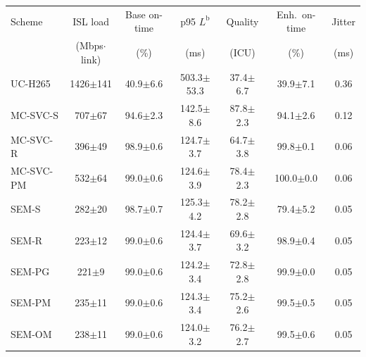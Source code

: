 \begin{tabular}{@{}lcccccc@{}}
\toprule
Scheme & ISL load & Base on-time & p95 $L^{\mathrm b}$ & Quality & Enh.\ on-time & Jitter\\
 & (Mbps$\cdot$link) & (\%) & (ms) & (ICU) & (\%) & (ms)\\
\midrule
UC-H265 & 1426$\pm$141 & 40.9$\pm$6.6 & 503.3$\pm$53.3 & 37.4$\pm$6.7 & 39.9$\pm$7.1 & 0.36\\
MC-SVC-S & 707$\pm$67 & 94.6$\pm$2.3 & 142.5$\pm$8.6 & 87.8$\pm$2.3 & 94.1$\pm$2.6 & 0.12\\
MC-SVC-R & 396$\pm$49 & 98.9$\pm$0.6 & 124.7$\pm$3.7 & 64.7$\pm$3.8 & 99.8$\pm$0.1 & 0.06\\
MC-SVC-PM & 532$\pm$64 & 99.0$\pm$0.6 & 124.6$\pm$3.9 & 78.4$\pm$2.3 & 100.0$\pm$0.0 & 0.06\\
SEM-S & 282$\pm$20 & 98.7$\pm$0.7 & 125.3$\pm$4.2 & 78.2$\pm$2.8 & 79.4$\pm$5.2 & 0.05\\
SEM-R & 223$\pm$12 & 99.0$\pm$0.6 & 124.4$\pm$3.7 & 69.6$\pm$3.2 & 98.9$\pm$0.4 & 0.05\\
SEM-PG & 221$\pm$9 & 99.0$\pm$0.6 & 124.2$\pm$3.4 & 72.8$\pm$2.8 & 99.9$\pm$0.0 & 0.05\\
SEM-PM & 235$\pm$11 & 99.0$\pm$0.6 & 124.3$\pm$3.4 & 75.2$\pm$2.6 & 99.5$\pm$0.5 & 0.05\\
SEM-OM & 238$\pm$11 & 99.0$\pm$0.6 & 124.0$\pm$3.2 & 76.2$\pm$2.7 & 99.5$\pm$0.6 & 0.05\\
\bottomrule
\end{tabular}

